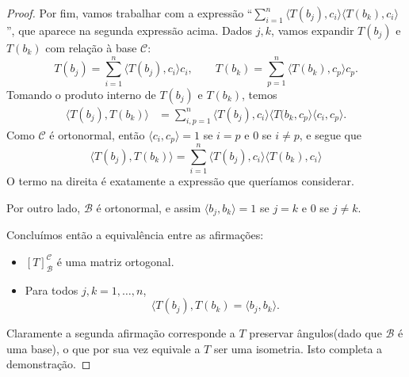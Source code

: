 \begin{proof}
	Por fim, vamos trabalhar com a expressão ``$\sum_{i=1}^n\langle T(b_j),c_i\rangle\langle T(b_k),c_i\rangle$'', que aparece na segunda expressão acima. Dados $j,k$, vamos expandir $T(b_j)$ e $T(b_k)$ com relação à base $\mathcal{C}$:
	\[T(b_j)=\sum_{i=1}^n \langle T(b_j),c_i\rangle c_i,\qquad T(b_k)=\sum_{p=1}^n\langle T(b_k),c_p\rangle c_p.\]
	Tomando o produto interno de $T(b_j)$ e $T(b_k)$, temos
	\begin{align*}
		\langle T(b_j),T(b_k)\rangle
			&=\sum_{i,p=1}^n\langle T(b_j),c_i\rangle \langle T(b_k,c_p\rangle \langle c_i,c_p\rangle.
	\end{align*}
	Como $\mathcal{C}$ é ortonormal, então $\langle c_i,c_p\rangle=1$ se $i=p$ e $0$  se $i\neq p$, e segue que
	\[\langle T(b_j),T(b_k)\rangle=\sum_{i=1}^n\langle T(b_j),c_i\rangle\langle T(b_k),c_i\rangle\]
	O termo na direita é exatamente a expressão que queríamos considerar. 
	
	Por outro lado, $\mathcal{B}$ é ortonormal, e assim $\langle b_j,b_k\rangle=1$ se $j=k$ e $0$ se $j\neq k$.
	
	Concluímos então a equivalência entre as afirmações:
	\begin{itemize}
		\item $[T]_{\mathcal{B}}^{\mathcal{C}}$ é uma matriz ortogonal.
		\item Para todos $j,k=1,\ldots, n$,
		\[\langle T(b_j),T(b_k)=\langle b_j,b_k\rangle.\]
	\end{itemize}
	Claramente a segunda afirmação corresponde a $T$ preservar ângulos(dado que $\mathcal{B}$ é uma base), o que por sua vez equivale a $T$ ser uma isometria. Isto completa a demonstração.
\end{proof}